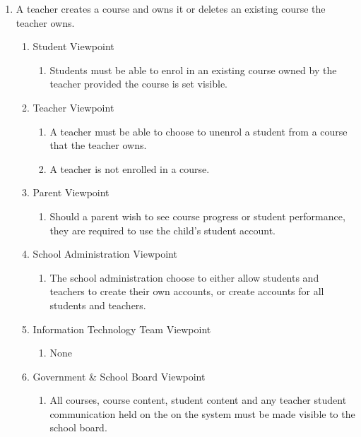 \documentclass[]{article}
\begin{document}
\begin{enumerate}[{BE}1.]
	\item A teacher creates a course and owns it or deletes an existing course the teacher owns.
	\begin{enumerate}[{VP1}.1]
		\item Student Viewpoint
			\begin{enumerate}
				\item Students must be able to enrol in an existing course owned by the teacher provided the course is set visible.
			\end{enumerate}
		\item Teacher Viewpoint
			\begin{enumerate}
				\item A teacher must be able to choose to unenrol a student from a course that the teacher owns.
				\item A teacher is not enrolled in a course.
			\end{enumerate}
		\item Parent Viewpoint
			\begin{enumerate}
				\item Should a parent wish to see course progress or student performance, they are required to use the child's student account.
			\end{enumerate}
		\item School Administration Viewpoint
			\begin{enumerate}
				\item The school administration choose to either allow students and teachers to create their own accounts, or create accounts for all students and teachers.
			\end{enumerate}
		\item Information Technology Team Viewpoint
			\begin{enumerate}
				\item None
			\end{enumerate}
		\item Government \& School Board Viewpoint
			\begin{enumerate}
				\item All courses, course content, student content and any teacher student communication held on the on the system must be made visible to the school board.
			\end{enumerate}
	\end{enumerate}


\end{enumerate}
\end{document}
